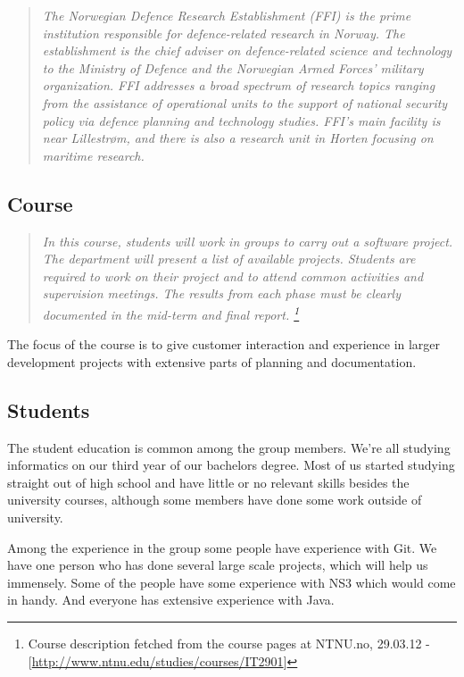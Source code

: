     \begin{quotation}
    \em The Norwegian Defence Research Establishment (FFI) is the prime institution responsible for defence-related research in Norway. The establishment is the chief adviser on defence-related science and technology to the Ministry of Defence and the Norwegian Armed Forces’ military organization. FFI addresses a broad spectrum of research topics ranging from the assistance of operational units to the support of national security policy via defence planning and technology studies. FFI's main facility is near Lillestrøm, and there is also a research unit in Horten focusing on maritime research.
    \end{quotation}
    
    \subsection{Course}\label{Course}
    \begin{quotation}
    \em In this course, students will work in groups to carry out a software project. The department will present a list of available projects. Students are required to work on their project and to attend common activities and supervision meetings. The results from each phase must be clearly documented in the mid-term and final report.
    \footnote{Course description fetched from the course pages at NTNU.no, 29.03.12 - [\url{http://www.ntnu.edu/studies/courses/IT2901}]}
    \end{quotation}
    
    The focus of the course is to give customer interaction and experience in larger development projects with extensive parts of planning and documentation. 
    
    
    \subsection{Students}\label{Students}
    The student education is common among the group members. We're all studying informatics on our third year of our bachelors degree. Most of us started studying straight out of high school and have little or no relevant skills besides the university courses, although some members have done some work outside of university. 
    
    Among the experience in the group some people have experience with Git. We have one person who has done several large scale projects, which will help us immensely. Some of the people have some experience with NS3 which would come in handy. And everyone has extensive experience with Java.
    

